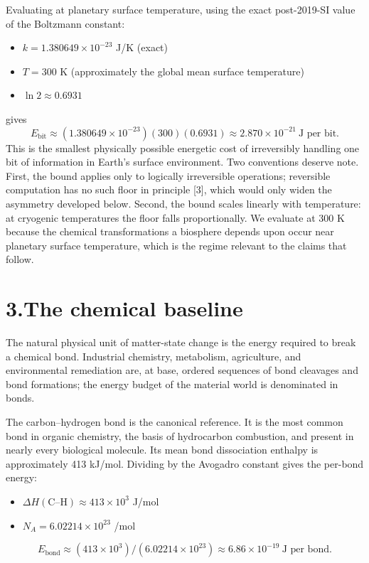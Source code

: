 \documentclass[11pt]{article}
\begin{document}
Evaluating at planetary surface temperature, using the exact post-2019-SI value of the Boltzmann constant:
\begin{itemize}[noitemsep,topsep=0pt]
\item $k = 1.380649 \times 10^{-23}$ J/K (exact)
\item $T = 300$ K (approximately the global mean surface temperature)
\item $\ln 2 \approx 0.6931$
\end{itemize}
gives
\[
E_{\text{bit}} \approx (1.380649 \times 10^{-23})(300)(0.6931) \approx 2.870 \times 10^{-21}\ \text{J per bit.}
\]
This is the smallest physically possible energetic cost of irreversibly handling one bit of information in Earth's surface environment. Two conventions deserve note. First, the bound applies only to logically irreversible operations; reversible computation has no such floor in principle [3], which would only widen the asymmetry developed below. Second, the bound scales linearly with temperature: at cryogenic temperatures the floor falls proportionally. We evaluate at 300 K because the chemical transformations a biosphere depends upon occur near planetary surface temperature, which is the regime relevant to the claims that follow.

\section*{3.\quad The chemical baseline}
The natural physical unit of matter-state change is the energy required to break a chemical bond. Industrial chemistry, metabolism, agriculture, and environmental remediation are, at base, ordered sequences of bond cleavages and bond formations; the energy budget of the material world is denominated in bonds.

The carbon--hydrogen bond is the canonical reference. It is the most common bond in organic chemistry, the basis of hydrocarbon combustion, and present in nearly every biological molecule. Its mean bond dissociation enthalpy is approximately 413 kJ/mol. Dividing by the Avogadro constant gives the per-bond energy:
\begin{itemize}[noitemsep,topsep=0pt]
\item $\Delta H(\text{C--H}) \approx 413 \times 10^{3}$ J/mol
\item $N_A = 6.02214 \times 10^{23}$ /mol
\end{itemize}
\[
E_{\text{bond}} \approx (413 \times 10^{3}) / (6.02214 \times 10^{23}) \approx 6.86 \times 10^{-19}\ \text{J per bond.}
\]
\end{document}

